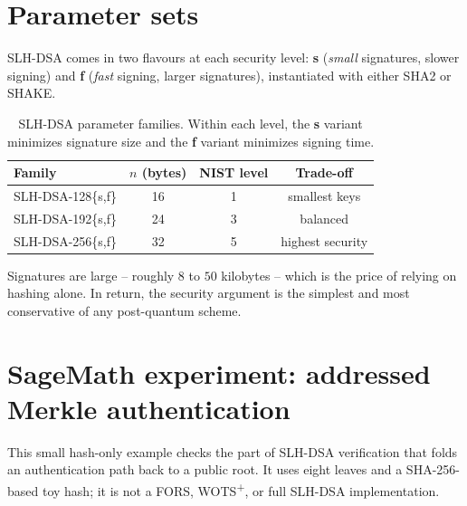 \section{Parameter sets}
SLH-DSA comes in two flavours at each security level: \textbf{s} (\emph{small} signatures, slower signing) and \textbf{f} (\emph{fast} signing, larger signatures), instantiated with either SHA2 or SHAKE.

\begin{table}[H]
\centering
\begin{tabular}{lccc}
\toprule
Family & $n$ (bytes) & NIST level & Trade-off \\
\midrule
SLH-DSA-128\{s,f\} & 16 & 1 & smallest keys \\
SLH-DSA-192\{s,f\} & 24 & 3 & balanced \\
SLH-DSA-256\{s,f\} & 32 & 5 & highest security \\
\bottomrule
\end{tabular}
\caption{SLH-DSA parameter families. Within each level, the \textbf{s} variant minimizes signature size and the \textbf{f} variant minimizes signing time.}
\end{table}

Signatures are large -- roughly $8$ to $50$ kilobytes -- which is the price of relying on hashing alone. In return, the security argument is the simplest and most conservative of any post-quantum scheme.

\section{SageMath experiment: addressed Merkle authentication}

This small hash-only example checks the part of SLH-DSA verification that folds
an authentication path back to a public root. It uses eight leaves and a
SHA-256-based toy hash; it is not a FORS, WOTS\textsuperscript{+}, or full
SLH-DSA implementation.

